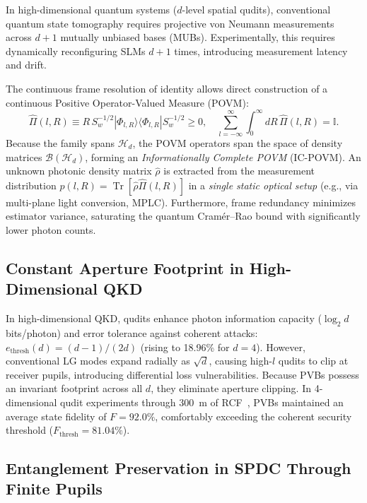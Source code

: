 \documentclass{optica-article}
\begin{document}
In high-dimensional quantum systems ($d$-level spatial qudits), conventional quantum state tomography requires projective von Neumann measurements across $d+1$ mutually unbiased bases (MUBs). Experimentally, this requires dynamically reconfiguring SLMs $d+1$ times, introducing measurement latency and drift.

The continuous frame resolution of identity allows direct construction of a continuous Positive Operator-Valued Measure (POVM):
\begin{equation}
\boxed{\hat{\Pi}(l, R) \equiv R \, S_w^{-1/2} |\Phi_{l, R}\rangle \langle \Phi_{l, R}| S_w^{-1/2} \ge 0, \quad \sum_{l=-\infty}^\infty \int_0^\infty dR \, \hat{\Pi}(l, R) = \mathbb{I}.}
\label{eq:povm_def}
\end{equation}
Because the family spans $\mathcal{H}_d$, the POVM operators span the space of density matrices $\mathcal{B}(\mathcal{H}_d)$, forming an \emph{Informationally Complete POVM} (IC-POVM). An unknown photonic density matrix $\hat{\rho}$ is extracted from the measurement distribution $p(l, R) = \operatorname{Tr}[\hat{\rho} \hat{\Pi}(l, R)]$ in a \emph{single static optical setup} (e.g., via multi-plane light conversion, MPLC). Furthermore, frame redundancy minimizes estimator variance, saturating the quantum Cram{\'e}r--Rao bound with significantly lower photon counts.

\subsection{Constant Aperture Footprint in High-Dimensional QKD}

In high-dimensional QKD, qudits enhance photon information capacity ($\log_2 d$ bits/photon) and error tolerance against coherent attacks: $e_{\text{thresh}}(d) = (d-1)/(2d)$ (rising to 18.96\% for $d=4$). However, conventional LG modes expand radially as $\sqrt{d}$, causing high-$l$ qudits to clip at receiver pupils, introducing differential loss vulnerabilities. Because PVBs possess an invariant footprint across all $d$, they eliminate aperture clipping. In 4-dimensional qudit experiments through 300~m of RCF~\cite{Villalba2023}, PVBs maintained an average state fidelity of $F = 92.0\%$, comfortably exceeding the coherent security threshold ($F_{\text{thresh}} = 81.04\%$).

\subsection{Entanglement Preservation in SPDC Through Finite Pupils}
\end{document}
